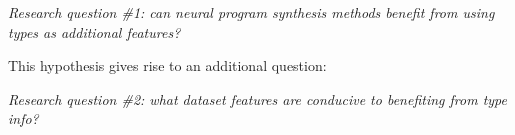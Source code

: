 \documentclass{article}
\begin{document}
\begin{displayquote} %
    \emph{Research question \#1: can neural program synthesis methods benefit from using types as additional features?}
\end{displayquote}

This hypothesis gives rise to an additional question:
\begin{displayquote} %
    \emph{Research question \#2: what dataset features are conducive to benefiting from type info?}
\end{displayquote}







\end{document}
